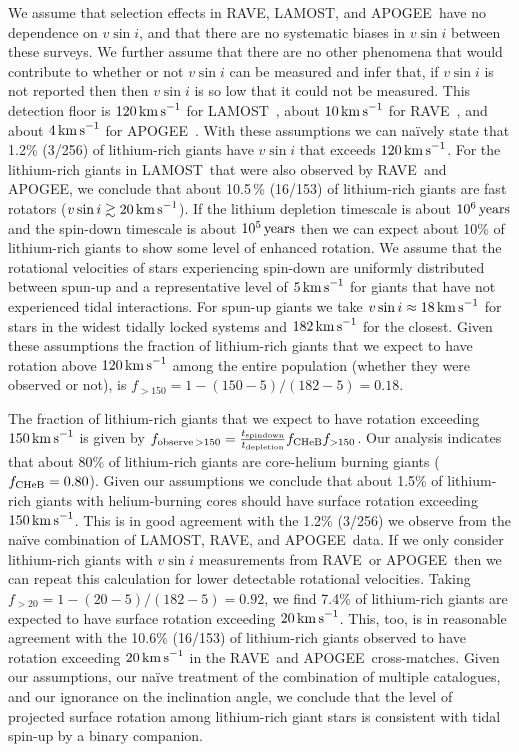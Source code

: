 \documentclass[twocolumn]{aastex62}
\newcommand\lamost{LAMOST}
\newcommand\apogee{APOGEE}
\newcommand\rave{RAVE}
\begin{document}
We assume that selection effects in \rave, \lamost, and \apogee\ 
have no dependence on $v\sin{i}$, and that there are no systematic biases in $v\sin{i}$ between these surveys. We further assume that there are no other phenomena that would contribute to whether or not $v\sin{i}$ can be measured and infer that, if $v\sin{i}$ is not reported then then $v\sin{i}$ is  so low that it could not be measured. This detection floor is $120\,{\rm km\,s}^{-1}$ for \lamost\ \citep{Frasca_2016}, about $10\,{\rm km\,s}^{-1}$ for \rave\ \citep{Siebert_2011}, 
and about $4\,{\rm km\,s}^{-1}$ for \apogee\ \citep{Deshpande_2013}.  With these assumptions we can na\"ively state that 1.2\% (3/256) of lithium-rich giants have $v\sin{i}$ that exceeds $120\,{\rm km\,s}^{-1}$. 
For the lithium-rich giants in \lamost\ that were also observed by \rave\ and \apogee,
we conclude that about 10.5\,\% (16/153) of lithium-rich giants are fast rotators ($v\sin{i} \gtrsim 20\,{\rm km\,s}^{-1}$). If the lithium depletion timescale is about $10^6\,{\rm years}$ and the spin-down timescale is about $10^5\,{\rm years}$ \citep{Tout_1992} then we can expect about 10\% of lithium-rich giants to show some level of enhanced rotation. We assume that the rotational velocities of stars experiencing spin-down are uniformly distributed between spun-up and  a representative level of $5\,{\rm km\,s}^{-1}$ for giants that have not experienced tidal interactions. 
For spun-up  giants we take $v\sin{i} \approx 18\,{\rm km\,s}^{-1}$ for stars in the widest tidally locked systems and $182\,{\rm km\,s}^{-1}$ for the closest. 
Given these assumptions the fraction of lithium-rich giants that we expect to have rotation above $120\,{\rm km\,s}^{-1}$  among the entire population (whether they were observed or not), is $f_{>150} = 1 - (150 - 5)/(182 - 5) = 0.18$. 


The fraction of lithium-rich giants that we expect to have rotation exceeding $150\,{\rm km\,s}^{-1}$ is given by $f_{{\rm observe}\,>150} = \frac{t_{\rm spindown}}{t_{\rm depletion}} f_{\rm CHeB} f_{>150}$. Our analysis indicates that about 80\% of lithium-rich giants are core-helium burning giants ($f_{\rm CHeB} = 0.80$). Given our assumptions we conclude that about 1.5\% of lithium-rich giants with helium-burning cores should have surface rotation exceeding $150\,{\rm km\,s}^{-1}$. This is in good agreement with the 1.2\% (3/256) we observe from the na\"ive combination of \lamost, \rave, and \apogee\ data. If we only consider lithium-rich giants with $v\sin{i}$ measurements from \rave\ or \apogee\ then we can repeat this calculation for lower detectable rotational velocities. Taking $f_{>20} = 1 - (20 - 5)/(182 - 5) = 0.92$, we find 7.4\% of lithium-rich giants are expected to have surface rotation exceeding $20\,{\rm km\,s}^{-1}$. This, too, is in reasonable agreement with the 10.6\% (16/153) of lithium-rich giants observed to have rotation exceeding $20\,{\rm km\,s}^{-1}$ in the \rave\ and \apogee\ cross-matches. Given our assumptions,  our na\"ive treatment of the combination of multiple catalogues, and our ignorance on the inclination angle, we conclude that the level of projected surface rotation among lithium-rich giant stars is consistent with tidal spin-up by a binary companion.
\end{document}

